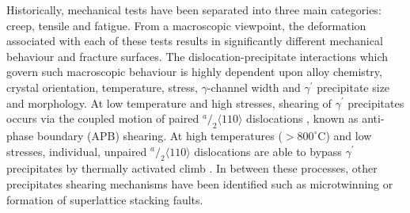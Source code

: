 \documentclass[a4paper,12pt,times,numbered,print,index]{Classes/PhDThesisPSnPDF}
\begin{document}
Historically, mechanical tests have been separated into three main categories: creep, tensile and fatigue. From a macroscopic viewpoint, the deformation associated with each of these tests results in significantly different mechanical behaviour and fracture surfaces. The dislocation-precipitate interactions which govern such macroscopic behaviour is highly dependent upon alloy chemistry, crystal orientation, temperature, stress,  $\gamma$-channel width and $\gamma^\prime$ precipitate size and morphology.
At low temperature and high stresses, shearing of $\gamma^\prime$ precipitates occurs via the coupled motion of paired $^a/_2 \langle 110 \rangle$ dislocations \cite{}, known as anti-phase boundary (APB) shearing. At high temperatures ($> 800^{\circ}$C) and low stresses, individual, unpaired $^a/_2 \langle 110 \rangle$ dislocations are able to bypass $\gamma^\prime$ precipitates by thermally activated climb \cite{}. In between these processes, other precipitates shearing mechanisms have been identified such as microtwinning or formation of superlattice stacking faults. %
\end{document}
